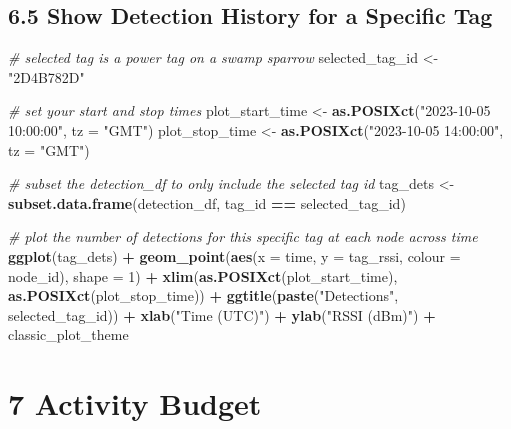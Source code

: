 \documentclass[
]{book}
\newenvironment{Shaded}{\begin{snugshade}}{\end{snugshade}}
\newcommand{\AttributeTok}[1]{\textcolor[rgb]{0.13,0.29,0.53}{#1}}
\newcommand{\CommentTok}[1]{\textcolor[rgb]{0.56,0.35,0.01}{\textit{#1}}}
\newcommand{\DecValTok}[1]{\textcolor[rgb]{0.00,0.00,0.81}{#1}}
\newcommand{\FunctionTok}[1]{\textcolor[rgb]{0.13,0.29,0.53}{\textbf{#1}}}
\newcommand{\NormalTok}[1]{#1}
\newcommand{\OtherTok}[1]{\textcolor[rgb]{0.56,0.35,0.01}{#1}}
\newcommand{\SpecialCharTok}[1]{\textcolor[rgb]{0.81,0.36,0.00}{\textbf{#1}}}
\newcommand{\StringTok}[1]{\textcolor[rgb]{0.31,0.60,0.02}{#1}}
\begin{document}
\section{6.5 Show Detection History for a Specific Tag}\label{show-detection-history-for-a-specific-tag}

\begin{Shaded}
\begin{Highlighting}[]
\CommentTok{\# selected tag is a power tag on a swamp sparrow}
\NormalTok{selected\_tag\_id }\OtherTok{\textless{}{-}} \StringTok{"2D4B782D"}

\CommentTok{\# set your start and stop times}
\NormalTok{plot\_start\_time }\OtherTok{\textless{}{-}} \FunctionTok{as.POSIXct}\NormalTok{(}\StringTok{"2023{-}10{-}05 10:00:00"}\NormalTok{, }\AttributeTok{tz =} \StringTok{"GMT"}\NormalTok{)}
\NormalTok{plot\_stop\_time }\OtherTok{\textless{}{-}} \FunctionTok{as.POSIXct}\NormalTok{(}\StringTok{"2023{-}10{-}05 14:00:00"}\NormalTok{, }\AttributeTok{tz =} \StringTok{"GMT"}\NormalTok{)}

\CommentTok{\# subset the detection\_df to only include the selected tag id}
\NormalTok{tag\_dets }\OtherTok{\textless{}{-}} \FunctionTok{subset.data.frame}\NormalTok{(detection\_df, tag\_id }\SpecialCharTok{==}\NormalTok{ selected\_tag\_id)}

\CommentTok{\# plot the number of detections for this specific tag at each node across time}
\FunctionTok{ggplot}\NormalTok{(tag\_dets) }\SpecialCharTok{+}
  \FunctionTok{geom\_point}\NormalTok{(}\FunctionTok{aes}\NormalTok{(}\AttributeTok{x =}\NormalTok{ time, }
                 \AttributeTok{y =}\NormalTok{ tag\_rssi, }
                 \AttributeTok{colour =}\NormalTok{ node\_id), }
             \AttributeTok{shape =} \DecValTok{1}\NormalTok{) }\SpecialCharTok{+}
  \FunctionTok{xlim}\NormalTok{(}\FunctionTok{as.POSIXct}\NormalTok{(plot\_start\_time), }
       \FunctionTok{as.POSIXct}\NormalTok{(plot\_stop\_time)) }\SpecialCharTok{+}
  \FunctionTok{ggtitle}\NormalTok{(}\FunctionTok{paste}\NormalTok{(}\StringTok{"Detections"}\NormalTok{, }
\NormalTok{                selected\_tag\_id)) }\SpecialCharTok{+}
  \FunctionTok{xlab}\NormalTok{(}\StringTok{"Time (UTC)"}\NormalTok{) }\SpecialCharTok{+}
  \FunctionTok{ylab}\NormalTok{(}\StringTok{"RSSI (dBm)"}\NormalTok{) }\SpecialCharTok{+}
\NormalTok{  classic\_plot\_theme}
\end{Highlighting}
\end{Shaded}

\chapter{7 Activity Budget}\label{activity-budget}
\end{document}
